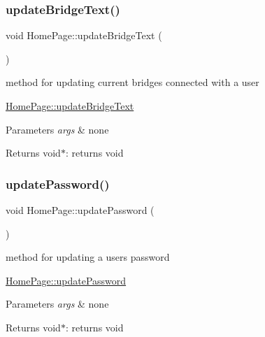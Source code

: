 \subsubsection{\texorpdfstring{update\+Bridge\+Text()}{updateBridgeText()}}
{\footnotesize\ttfamily void Home\+Page\+::update\+Bridge\+Text (\begin{DoxyParamCaption}{ }\end{DoxyParamCaption})\hspace{0.3cm}{\ttfamily [private]}}



method for updating current bridges connected with a user 

\hyperlink{class_home_page_a0231c983e866ff4f574d9f26cac7c944}{Home\+Page\+::update\+Bridge\+Text} 
\begin{DoxyParams}{Parameters}
{\em args} & none \\
\hline
\end{DoxyParams}
\begin{DoxyReturn}{Returns}
void$\ast$\+: returns void 
\end{DoxyReturn}
\mbox{\label{class_home_page_aa8de2797f59b77f46f0eaadaec8a63ed}} 
\subsubsection{\texorpdfstring{update\+Password()}{updatePassword()}}
{\footnotesize\ttfamily void Home\+Page\+::update\+Password (\begin{DoxyParamCaption}{ }\end{DoxyParamCaption})\hspace{0.3cm}{\ttfamily [private]}}



method for updating a user\textquotesingle{}s password 

\hyperlink{class_home_page_aa8de2797f59b77f46f0eaadaec8a63ed}{Home\+Page\+::update\+Password} 
\begin{DoxyParams}{Parameters}
{\em args} & none \\
\hline
\end{DoxyParams}
\begin{DoxyReturn}{Returns}
void$\ast$\+: returns void 
\end{DoxyReturn}
\mbox{\label{class_home_page_af34743abfb066e71ef7b1d2f507415eb}} 
